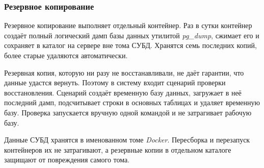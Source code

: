 \subsubsection{Резервное копирование}

Резервное копирование выполняет отдельный контейнер. Раз в сутки контейнер создаёт полный логический дамп базы данных утилитой \textit{pg\_dump}, сжимает его и сохраняет в каталог на сервере вне тома СУБД. Хранятся семь последних копий, более старые удаляются автоматически.

Резервная копия, которую ни разу не восстанавливали, не даёт гарантии, что данные удастся вернуть. Поэтому в систему входит сценарий проверки восстановления. Сценарий создаёт временную базу данных, загружает в неё последний дамп, подсчитывает строки в основных таблицах и удаляет временную базу. Проверка запускается вручную одной командой и не затрагивает рабочую базу.

Данные СУБД хранятся в именованном томе \textit{Docker}. Пересборка и перезапуск контейнеров их не затрагивают, а резервные копии в отдельном каталоге защищают от повреждения самого тома.
